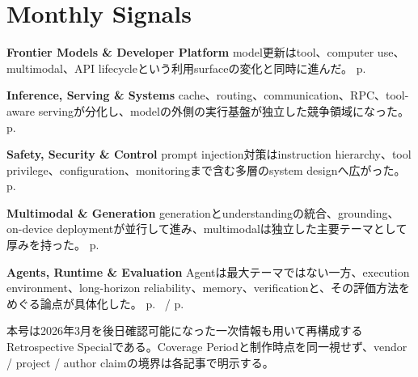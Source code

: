 \section*{Monthly Signals}
\smallskip
\noindent \textbf{Frontier Models \& Developer Platform} model更新はtool、computer use、multimodal、API lifecycleという利用surfaceの変化と同時に進んだ。 \hfill{\footnotesize p.~\pageref{pkg:frontier-models-platform-march}}
\par
\smallskip
\noindent \textbf{Inference, Serving \& Systems} cache、routing、communication、RPC、tool-aware servingが分化し、modelの外側の実行基盤が独立した競争領域になった。 \hfill{\footnotesize p.~\pageref{pkg:inference-serving-systems-march}}
\par
\smallskip
\noindent \textbf{Safety, Security \& Control} prompt injection対策はinstruction hierarchy、tool privilege、configuration、monitoringまで含む多層のsystem designへ広がった。 \hfill{\footnotesize p.~\pageref{pkg:safety-security-control-march}}
\par
\smallskip
\noindent \textbf{Multimodal \& Generation} generationとunderstandingの統合、grounding、on-device deploymentが並行して進み、multimodalは独立した主要テーマとして厚みを持った。 \hfill{\footnotesize p.~\pageref{pkg:multimodal-generation-march}}
\par
\smallskip
\noindent \textbf{Agents, Runtime \& Evaluation} Agentは最大テーマではない一方、execution environment、long-horizon reliability、memory、verificationと、その評価方法をめぐる論点が具体化した。 \hfill{\footnotesize p.~\pageref{pkg:agents-runtime-long-horizon-march} / p.~\pageref{pkg:paper-watch-march}}
\par
\medskip
\begin{claimboundary}
本号は2026年3月を後日確認可能になった一次情報も用いて再構成するRetrospective Specialである。Coverage Periodと制作時点を同一視せず、vendor / project / author claimの境界は各記事で明示する。
\end{claimboundary}
\medskip
\tableofcontents
